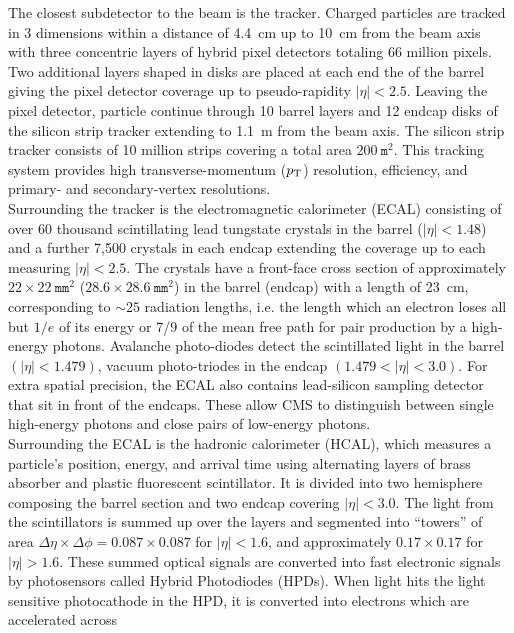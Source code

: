 The closest subdetector to the beam is the tracker. Charged particles are tracked in 
3 dimensions within a distance of 4.4~cm up to 10~cm from the beam axis with three concentric layers of hybrid 
pixel detectors totaling 66 million pixels. Two additional layers shaped in disks are placed at each 
end the of the barrel giving the pixel detector coverage up to pseudo-rapidity $|\eta| < 2.5$.
Leaving the pixel detector, particle continue through 10 barrel layers and 12 endcap disks 
of the silicon strip tracker extending to 1.1~m from the beam axis. The silicon strip tracker
consists of 10 million strips covering a total area $200~\texttt{m}^2$.  This tracking system
provides high transverse-momentum ($p_{\mathrm{T}}$) resolution, efficiency, and primary- and secondary-vertex
resolutions.\\
\indent Surrounding the tracker is the electromagnetic calorimeter (ECAL) consisting of over 60 thousand scintillating 
lead tungstate crystals in the barrel ($|\eta| < 1.48$) and a further 7,500 crystals in each endcap extending
the coverage up to each measuring $|\eta| < 2.5$. The crystals have a front-face cross section
of approximately $22 \times 22~\texttt{mm}^2$ ($28.6 \times 28.6~\texttt{mm}^2$) in the barrel (endcap) with a
length of 23~cm, corresponding to $\sim25$ radiation lengths, i.e. the length which an electron loses
all but $1/e$ of its energy or 7/9 of the mean free path for pair production by a high-energy photons.  
Avalanche photo-diodes detect the scintillated light in the barrel $(|\eta| < 1.479)$, vacuum photo-triodes 
in the endcap $(1.479 < |\eta| < 3.0)$. For extra spatial precision, the ECAL also contains lead-silicon 
sampling detector that sit in front of the endcaps. These allow CMS to distinguish between single high-energy 
photons and close pairs of low-energy photons.\\
\indent Surrounding the ECAL is the hadronic calorimeter (HCAL), which measures a particle's position, 
energy, and arrival time using alternating layers of brass absorber and plastic fluorescent scintillator.
It is divided into two hemisphere composing the barrel section and two endcap covering $|\eta| < 3.0$. 
The light from the scintillators is summed up over the layers and segmented into 
``towers'' of area $\Delta\eta \times \Delta\phi = 0.087 \times 0.087$ for $|\eta| < 1.6$, 
and approximately $0.17 \times 0.17$ for $|\eta| > 1.6$. These summed optical signals are converted 
into fast electronic signals by photosensors called Hybrid Photodiodes (HPDs). When light hits the 
light sensitive photocathode in the HPD, it is converted into electrons which are accelerated across 
